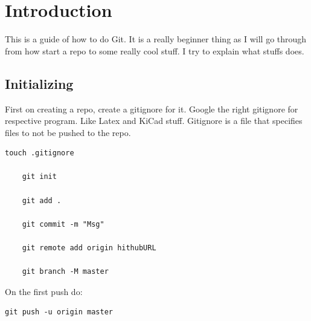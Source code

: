 \documentclass[12pt]{report} %
\begin{document}
\listoffigures
\newpage

\listoftables
{}
\newpage

\lstlistoflistings
{}
\newpage
\setcounter{page}{1}


\chapter{Introduction}
This is a guide of how to do Git. It is a really beginner thing as I will go through from how start a repo to some really cool stuff. I try to explain what stuffs does. 

\section{Initializing}

First on creating a repo, create a gitignore for it. Google the right gitignore for respective program. Like Latex and KiCad stuff. Gitignore is a file that specifies files to not be pushed to the repo. 


\begin{lstlisting}[caption={Commands for init first repo},captionpos=b,label=lst:firstRepo]
	touch .gitignore

	git init 
	
	git add .
	
	git commit -m "Msg"
	
	git remote add origin hithubURL
	
	git branch -M master
\end{lstlisting}

On the first push do:
\begin{lstlisting}[caption={First Push},captionpos=b,label=lst:firstPush]
	git push -u origin master
\end{lstlisting}
\end{document}
